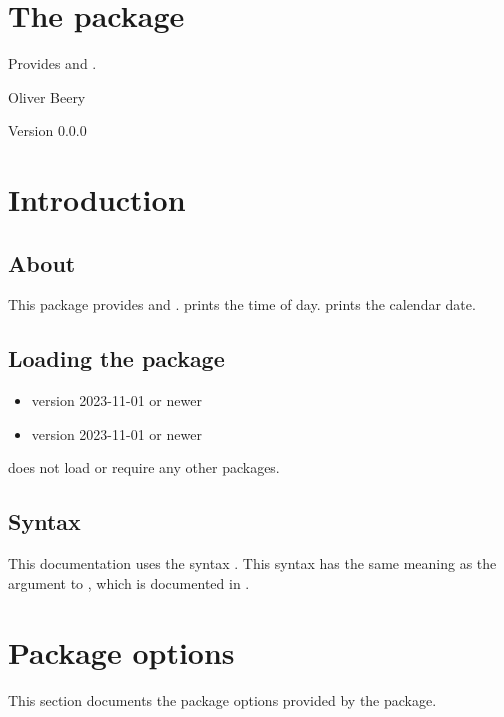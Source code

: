 \documentclass{beery}
\begin{document}
\section*{The  package}

Provides  and .

Oliver Beery

Version 0.0.0\quad\date{2025-9-22}


\section{Introduction}
\label{sec:introduction}

\subsection{About}

This package provides  and .
 prints the time of day.
 prints the calendar date.

\subsection{Loading the package}
\label{subsec:loading}

\begin{itemize}
  \item \LaTeXe{} version 2023-11-01 or newer
  \item {} version 2023-11-01 or newer
\end{itemize}

 does not load or require any other packages.

\subsection{Syntax}
\label{subsec:syntax}

This documentation uses the syntax .
This syntax has the same meaning as the argument to , which is documented in .


\section{Package options}
\label{sec:packageoptions}

This section documents the package options provided by the  package.
\end{document}
